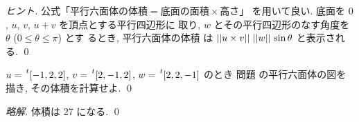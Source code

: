 \documentclass[12pt,twoside]{jarticle}
\newcommand\commentout[1]{#1}
\newcommand\commentout[1]{}
\begin{document}
\begin{proof}[ヒント]
  公式「$\text{平行六面体の体積}=\text{底面の面積}\times\text{高さ}$」
  を用いて良い. 底面を $0$, $u$, $v$, $u+v$ を頂点とする平行四辺形に
  取り, $w$ とその平行四辺形のなす角度を $\theta$ ($0\le\theta\le\pi$) とす
  るとき, 平行六面体の体積
  は $\left|\left|u\times v\right|\right|\,\left|\left|w\right|\right|\,\sin\theta$ と表示される.
  \qed
\end{proof}


\begin{question}
  \label{q:vol-6mentai-1}
  $u=\tp{[-1,2,2]}$, $v=\tp{[2,-1,2]}$, $w=\tp{[2,2,-1]}$ のとき
  問題  の平行六面体の図を描き, その体積を計算せよ.
  \qed
\end{question}

\commentout{
\begin{proof}[略解]
  体積は 27 になる. \qed
\end{proof}
}

\end{document}
